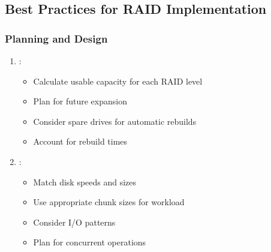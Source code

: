 \documentclass[letterpaper,10pt,english]{sphinxmanual}
\begin{document}
\subsection{Best Practices for RAID Implementation}
\label{\detokenize{raid-systems:best-practices-for-raid-implementation}}

\subsubsection{Planning and Design}
\label{\detokenize{raid-systems:planning-and-design}}\begin{enumerate}
%
\item {} 
\sphinxAtStartPar
{}:
\begin{itemize}
\item {} 
\sphinxAtStartPar
Calculate usable capacity for each RAID level

\item {} 
\sphinxAtStartPar
Plan for future expansion

\item {} 
\sphinxAtStartPar
Consider spare drives for automatic rebuilds

\item {} 
\sphinxAtStartPar
Account for rebuild times

\end{itemize}

\item {} 
\sphinxAtStartPar
{}:
\begin{itemize}
\item {} 
\sphinxAtStartPar
Match disk speeds and sizes

\item {} 
\sphinxAtStartPar
Use appropriate chunk sizes for workload

\item {} 
\sphinxAtStartPar
Consider I/O patterns

\item {} 
\sphinxAtStartPar
Plan for concurrent operations

\end{itemize}

\end{enumerate}
\end{document}
